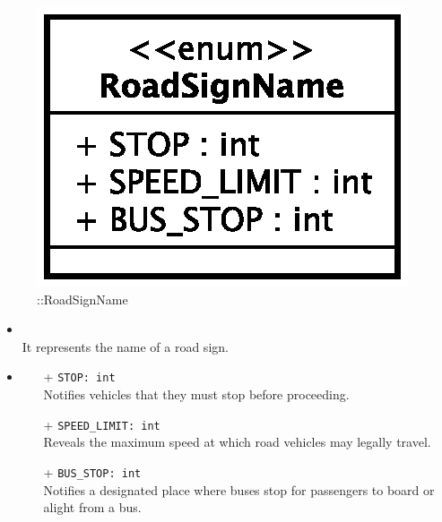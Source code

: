 \begin{figure}[h]
\centering
\includegraphics[scale=0.6,keepaspectratio]{images/solution/app/backend/road_sign_name.eps}
\caption{\pReactiveComponentStretchDecoration::RoadSignName}
\label{fig:sd-app-road-sign-name}
\end{figure}
\FloatBarrier
\begin{itemize}
  \item \textbf{\descr} \\
    It represents the name of a road sign.
  \item \textbf{}
  \begin{itemize}
    \item[+] \texttt{STOP: int} \\
	Notifies vehicles that they must stop before proceeding.
    \item[+] \texttt{SPEED\_LIMIT: int} \\
    Reveals the maximum speed at which road vehicles may legally travel.
    \item[+] \texttt{BUS\_STOP: int} \\
    Notifies a designated place where buses stop for passengers to board 
    or alight from a bus.
  \end{itemize}
\end{itemize}